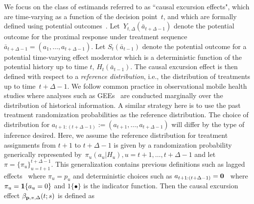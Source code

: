 \documentclass[lineno]{biometrika}
\begin{document}
We focus on the class of estimands referred to as ``causal excursion effects", which are time-varying as a function of the decision point~$t$, and which are formally defined using potential outcomes~\citep{Rubin, Robins}.  Let~$Y_{t,\Delta} (\bar a_{t+\Delta-1})$ denote the potential outcome for the proximal response under treatment sequence~$\bar a_{t+\Delta-1} = (a_1, \ldots, a_{t+\Delta-1})$.  Let $S_t (\bar a_{t-1})$ denote the potential outcome for a potential time-varying effect moderator which is a deterministic function of the potential history up to time $t$, $H_t (\bar a_{t-1})$. The causal excursion effect is then defined with respect to a \emph{reference distribution}, i.e., the distribution of treatments up to time~$t+\Delta-1$. We follow common practice in observational mobile health studies where analyses such as GEEs~\citep{Liang1986} are conducted marginally over the distribution of historical information.  A similar strategy here is to use the past treatment randomization probabilities as the reference distribution.  The choice of distribution for $a_{t+1:(t+\Delta-1)} := (a_{t+1}, \ldots, a_{t+\Delta-1})$ will differ by the type of inference desired.  Here, we assume the reference distribution for treatment assignments from $t+1$ to $t+\Delta-1$ is given by a randomization probability generically represented by~$\pi_{u}(a_{u} | H_{u}), u=t+1,\ldots, t+\Delta-1$ and let $\pi=\{\pi_{u}\}_{u=t+1}^{t+\Delta-1}$.  This generalization contains previous definitions such as lagged effects~\citep{Boruvkaetal} where $\pi_{u} = p_{u}$ and deterministic choices such as $a_{t+1:(t+\Delta-1)} = {\bf 0}$~\citep{DempseyAOAS, Qian2021} where $\pi_{u} = {\bf 1}\{a_{u} = 0\}$ and $1\{\bullet\}$ is the indicator function.  Then the causal excursion effect $\beta_{{\bf p}, \pi, \Delta} (t;s)$ is defined as
\end{document}
